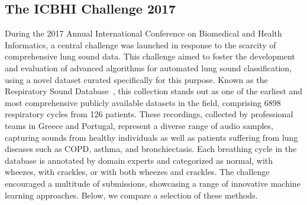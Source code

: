 \subsection{The ICBHI Challenge 2017}
During the 2017 Annual International Conference on Biomedical and Health Informatics, a central challenge was launched in response to the scarcity of comprehensive lung sound data. This challenge aimed to foster the development and evaluation of advanced algorithms for automated lung sound classification, using a novel dataset curated specifically for this purpose. Known as the Respiratory Sound Database~\cite{rocha2018alpha}, this collection stands out as one of the earliest and most comprehensive publicly available datasets in the field, comprising 6898 respiratory cycles from 126 patients. These recordings, collected by professional teams in Greece and Portugal, represent a diverse range of audio samples, capturing sounds from healthy individuals as well as patients suffering from lung diseases such as COPD, asthma, and bronchiectasis. Each breathing cycle in the database is annotated by domain experts and categorized as normal, with wheezes, with crackles, or with both wheezes and crackles. The challenge encouraged a multitude of submissions, showcasing a range of innovative machine learning approaches. Below, we compare a selection of these methods.


